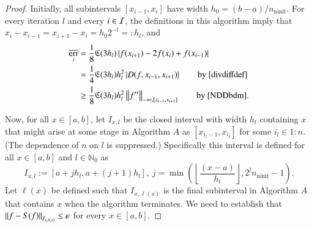\documentclass[review]{elsarticle}
\newcommand{\abstol}{\varepsilon}
\newcommand{\oton}{1\!:\!n}
\theoremstyle{definition}
\newcommand{\Ixl}{I_{x,l}}
\DeclareMathOperator{\ninit}{ninit}
\DeclareMathOperator{\oerr}{\overline{err}}
\begin{document}
\begin{proof} 
Initially, all subintervals $[x_{i-1},x_i]$ have width $h_0 = (b-a)/n_{\ninit}$.
For every iteration $l$ and every $i \in \mathcal{I}$, the definitions in this algorithm
imply that $x_i-x_{i-1} = x_{i+1} - x_i = h_0 2^{-l} =: h_l$, and
	\begin{align}
	\nonumber
	\oerr_i & =\frac{1}{8} \fC(3h_l)\abs{f(x_{i+1}) - 2f(x_i) + f(x_{i-1})}  \\ 
	& =  \frac{1}{4} \fC(3h_l) h_l^2 \abs{D(f,x_{i-1},x_{i+1})}  
	\qquad \text{by \eqref{divdiffdef}}  \label{divdiffbd}\\
	& \ge \frac{1} 8 \fC(3h_l) h_l^2 \norm[-\infty,{[x_{i-1},x_{i+1}]}]{f''}  
	\qquad \text{by \eqref{NDDbdm}}. \label{oerrbd}
	\end{align}
	
Now, for all $x \in [a,b]$, let $\Ixl$ be the closed interval with width $h_l$
containing $x$ that might arise at some stage in Algorithm $A$ as $[x_{i_l-1},
x_{i_l}]$ for some $i_l \in \oton$. (The dependence of $n$ on $l$ is
suppressed.) Specifically this interval is defined for all $ x \in [a,b]$ and $l
\in \mathbb{N}_0$ as
	\begin{equation}\label{Ixldef}
	\Ixl := \left[a+jh_l,a+(j+1) h_l\right], \ j=\min \left(\left\lfloor\frac{(x-a)}{h_l}\right\rfloor, 2^l n_{\ninit}-1 \right ).
	\end{equation}
Let $\ell(x)$ be defined such that $I_{x,\ell(x)}$ is the final subinterval in
Algorithm $A$ that contains $x$ when the algorithm terminates. We need to
establish that $\norm[I_{x,\ell(x)}]{f - S(f)} \le \abstol$ for every $x \in
[a,b]$.


\end{proof}
\end{document}
